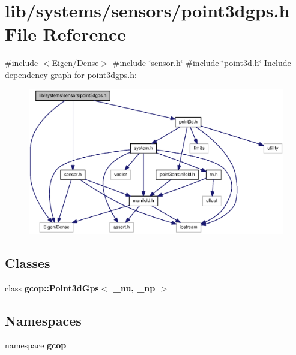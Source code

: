 \section{lib/systems/sensors/point3dgps.h \-File \-Reference}
\label{point3dgps_8h}
{\ttfamily \#include $<$\-Eigen/\-Dense$>$}\*
{\ttfamily \#include \char`\"{}sensor.\-h\char`\"{}}\*
{\ttfamily \#include \char`\"{}point3d.\-h\char`\"{}}\*
\-Include dependency graph for point3dgps.\-h\-:
\nopagebreak
\begin{figure}[H]
\begin{center}
\leavevmode
\includegraphics[width=350pt]{point3dgps_8h__incl}
\end{center}
\end{figure}
\subsection*{\-Classes}
\begin{DoxyCompactItemize}
\item 
class {\bf gcop\-::\-Point3d\-Gps$<$ \-\_\-nu, \-\_\-np $>$}
\end{DoxyCompactItemize}
\subsection*{\-Namespaces}
\begin{DoxyCompactItemize}
\item 
namespace {\bf gcop}
\end{DoxyCompactItemize}

